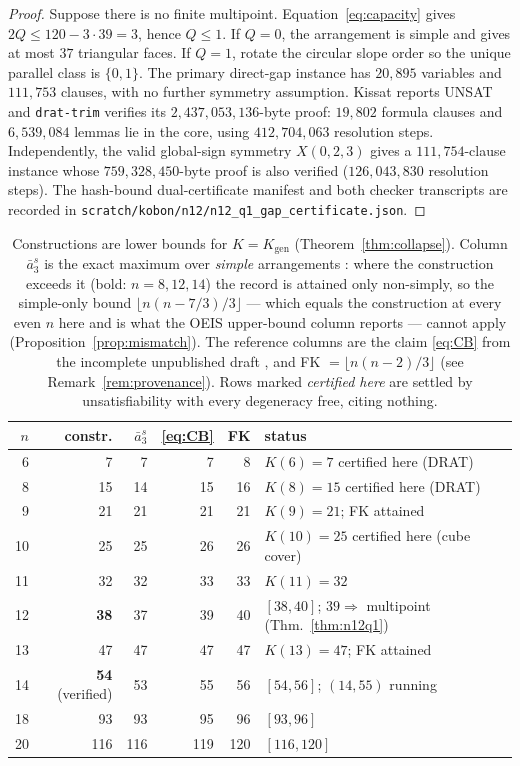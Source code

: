 \documentclass[11pt]{article}
\theoremstyle{definition}
\newcommand{\Kgen}{K_{\mathrm{gen}}}
\begin{document}
\begin{proof}
Suppose there is no finite multipoint. Equation~\eqref{eq:capacity} gives
$2Q\le120-3\cdot39=3$, hence $Q\le1$. If $Q=0$, the arrangement is simple
and \cite[Thm.~3]{Blanc} gives at most $37$ triangular faces. If $Q=1$,
rotate the circular slope order so the unique parallel class is
$\{0,1\}$. The primary direct-gap instance has $20{,}895$ variables and
$111{,}753$ clauses, with no further symmetry assumption. Kissat reports
UNSAT and \texttt{drat-trim} verifies its $2{,}437{,}053{,}136$-byte proof:
$19{,}802$ formula clauses and $6{,}539{,}084$ lemmas lie in the core, using
$412{,}704{,}063$ resolution steps. Independently, the valid global-sign
symmetry $X(0,2,3)$ gives a $111{,}754$-clause instance whose
$759{,}328{,}450$-byte proof is also verified ($126{,}043{,}830$ resolution
steps). The hash-bound dual-certificate manifest and both checker transcripts
are recorded in
\texttt{scratch/kobon/n12/n12\_q1\_gap\_certificate.json}.
\end{proof}

\begin{table}[t]
\centering
\begin{tabular}{rrrrrl}
\toprule
$n$ & constr. & $\bar a_3^s$ & \eqref{eq:CB} & FK & status\\
\midrule
6 & 7 & 7 & 7 & 8 & $K(6)=7$ certified here (DRAT)\\
8 & 15 & 14 & 15 & 16 & $K(8)=15$ certified here (DRAT)\\
9 & 21 & 21 & 21 & 21 & $K(9)=21$; FK attained\\
10 & 25 & 25 & 26 & 26 & $K(10)=25$ certified here (cube cover)\\
11 & 32 & 32 & 33 & 33 & $K(11)=32$ \cite{Savchuk}\\
12 & \textbf{38} & 37 & 39 & 40 & $[38,40]$; $39\Rightarrow$ multipoint (Thm.~\ref{thm:n12q1})\\
13 & 47 & 47 & 47 & 47 & $K(13)=47$; FK attained\\
14 & \textbf{54} (verified) & 53 & 55 & 56 & $[54,56]$; $(14,55)$ running\\
18 & 93 & 93 & 95 & 96 & $[93,96]$\\
20 & 116 & 116 & 119 & 120 & $[116,120]$\\
\bottomrule
\end{tabular}
\caption{Constructions are lower bounds for $K=\Kgen$
(Theorem~\ref{thm:collapse}). Column $\bar a_3^s$ is the exact maximum over
\emph{simple} arrangements \cite{BBL,Blanc}: where the construction exceeds
it (bold: $n=8,12,14$) the record is attained only non-simply, so the
simple-only bound $\lfloor n(n-7/3)/3\rfloor$ --- which equals the
construction at every even $n$ here and is what the OEIS upper-bound column
reports --- cannot apply (Proposition~\ref{prop:mismatch}). The reference
columns are the claim \eqref{eq:CB} from the incomplete unpublished draft
\cite{CB2007}, and FK $=\lfloor n(n-2)/3\rfloor$ \cite{FK1999} (see
Remark~\ref{rem:provenance}). Rows marked \emph{certified here} are settled
by unsatisfiability with every degeneracy free, citing nothing.}
\label{tab:windows}
\end{table}
\end{document}
